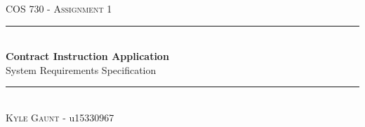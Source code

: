 \documentclass[11pt]{article}
\begin{document}
\begin{titlepage}
	\newcommand{\HRule}{\rule{\linewidth}{0.5mm}}
    \begin{center}
            
    	\textsc{\LARGE COS 730 - Assignment 1}\\[0.8cm]
    
    	\HRule\\[0.4cm]
    	
    	{\huge\bfseries Contract Instruction Application}\\[0.2cm]
    	
    	{\huge System Requirements Specification}\\[0.2cm]

    	\HRule\\[0.5cm]

	    \textsc{Kyle Gaunt} - u15330967 \\[0cm]
    
    \end{center}
\end{titlepage}

\tableofcontents
\newpage
\end{document}

